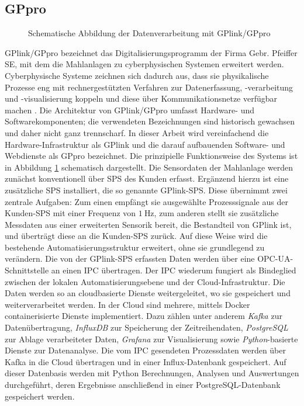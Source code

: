 \subsection{GPpro} \label{sec:GPpro}
%
\begin{figure}[hbt!]
    \centering
    
    \caption{Schematische Abbildung der Datenverarbeitung mit GPlink/GPpro}
    \label{fig:gplink}
\end{figure}
%
GPlink/GPpro bezeichnet das Digitalisierungsprogramm der Firma Gebr. Pfeiffer SE, mit dem die Mahlanlagen zu cyberphysischen Systemen erweitert werden. Cyberphysische Systeme zeichnen sich dadurch aus, dass sie physikalische Prozesse eng mit rechnergestützten Verfahren zur Datenerfassung, -verarbeitung und -visualisierung koppeln und diese über Kommunikationsnetze verfügbar machen \cite{lee.2008}. %
Die Architektur von GPlink/GPpro umfasst Hardware- und Softwarekomponenten; die verwendeten Bezeichnungen sind historisch gewachsen und daher nicht ganz trennscharf.
In dieser Arbeit wird vereinfachend die Hardware-Infrastruktur als GPlink und die darauf aufbauenden Software- und Webdienste als GPpro bezeichnet. 
Die prinzipielle Funktionsweise des Systems ist in Abbildung \ref{fig:gplink} schematisch dargestellt. Die Sensordaten der Mahlanlage werden zunächst konventionell über \ac{SPS} des Kunden erfasst. Ergänzend hierzu ist eine zusätzliche \ac{SPS} installiert, die so genannte GPlink-\ac{SPS}. Diese übernimmt zwei zentrale Aufgaben: Zum einen empfängt sie ausgewählte Prozesssignale aus der Kunden-\ac{SPS} mit einer Frequenz von $\SI{1}{\hertz}$, zum anderen stellt sie zusätzliche Messdaten aus einer erweiterten Sensorik bereit, die Bestandteil von GPlink ist, und überträgt diese an die Kunden-\ac{SPS} zurück. Auf diese Weise wird die bestehende Automatisierungsstruktur erweitert, ohne sie grundlegend zu verändern.
Die von der GPlink-\ac{SPS} erfassten Daten werden über eine OPC-UA-Schnittstelle an einen \ac{IPC} übertragen. Der \ac{IPC} wiederum fungiert als Bindeglied zwischen der lokalen Automatisierungsebene und der Cloud-Infrastruktur. Die Daten werden so an cloudbasierte Dienste weitergeleitet, wo sie gespeichert und weiterverarbeitet werden.
In der Cloud sind mehrere, mittels Docker containerisierte Dienste implementiert. Dazu zählen unter anderem \emph{Kafka} zur Datenübertragung, \emph{InfluxDB} zur Speicherung der Zeitreihendaten, \emph{PostgreSQL} zur Ablage verarbeiteter Daten, \emph{Grafana} zur Visualisierung sowie \emph{Python}-basierte Dienste zur Datenanalyse. Die vom \ac{IPC} gesendeten Prozessdaten werden über Kafka in die Cloud übertragen und in einer Influx-Datenbank gespeichert. Auf dieser Datenbasis werden mit Python Berechnungen, Analysen und Auswertungen durchgeführt, deren Ergebnisse anschließend in einer PostgreSQL-Datenbank gespeichert werden. 

